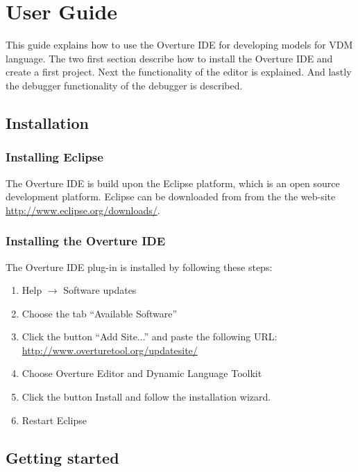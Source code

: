 \chapter{User Guide}

This guide explains how to use the Overture IDE for developing models for VDM
language. The two first section describe how to install the Overture IDE and
create a first project. Next the functionality of the editor is explained.
And lastly the debugger functionality of the debugger is described.


\section{Installation}
\subsection{Installing Eclipse}

The Overture IDE is build upon the Eclipse platform, which is an open source
development platform. Eclipse can be downloaded from from the the web-site
\url{http://www.eclipse.org/downloads/}. 

\subsection{Installing the Overture IDE}
\label{sec:userguide:InstallOverturePlugin}

The Overture IDE plug-in is installed by following these steps:
\begin{enumerate}
	\item Help $\rightarrow$ Software updates 
	\item Choose the tab ``Available Software'' 
	\item Click the button ``Add Site...'' and paste the following URL:\newline
	\url{http://www.overturetool.org/updatesite/} 
	\item Choose Overture Editor and Dynamic Language Toolkit
	\item Click the button Install and follow the installation wizard.
	\item Restart Eclipse 
\end{enumerate}

\section{Getting started}
\label{sec:userguide:GettingStarted}


